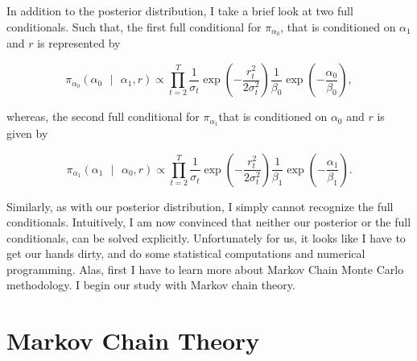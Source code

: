 \documentclass[a4paper,11pt,english]{article}
\begin{document}
			In addition to the posterior distribution, I take a brief look at two full conditionals. Such that, the first full conditional 
			for $\pi_{\alpha_0}$, that is conditioned on $\alpha_1$ and $r$ is represented by
				
			\begin{equation*}
				\pi_{\alpha_0} \left( \alpha_0 \text{ }|\text{ } \alpha_1 , r \right) \propto \prod_{t=2}^T{\frac{1}{\sigma_t}\exp{\left(-\frac{r^2_t}
				{2\sigma_t^2} \right)}}\frac{1}{\beta_0}\exp{\left( -\frac{\alpha_0}{\beta_0}\right)},
			\end{equation*}	 
			
			\noindent whereas, the second full conditional for $\pi_{\alpha_1}$that is conditioned on $\alpha_0$ and $r$  is given by

			\begin{equation*}
				\pi_{\alpha_1} \left( \alpha_1 \text{ }|\text{ } \alpha_0 , r \right) \propto \prod_{t=2}^T{\frac{1}{\sigma_t}\exp{\left(-\frac{r^2_t}
				{2\sigma_t^2} \right)}}\frac{1}{\beta_1}\exp{\left( -\frac{\alpha_1}{\beta_1}\right)}.
			\end{equation*}	 
			
			
			\noindent Similarly, as with our posterior distribution, I simply cannot recognize the full conditionals. Intuitively, I am now convinced 
			that neither our posterior or the full conditionals, can be solved explicitly. Unfortunately for us, it looks like I have to get our hands 
			dirty, and do some statistical computations and numerical programming. Alas, first I have to learn more about Markov Chain Monte Carlo 
			methodology. I begin our study with Markov chain theory.









	\section{Markov Chain Theory} 

\end{document}
